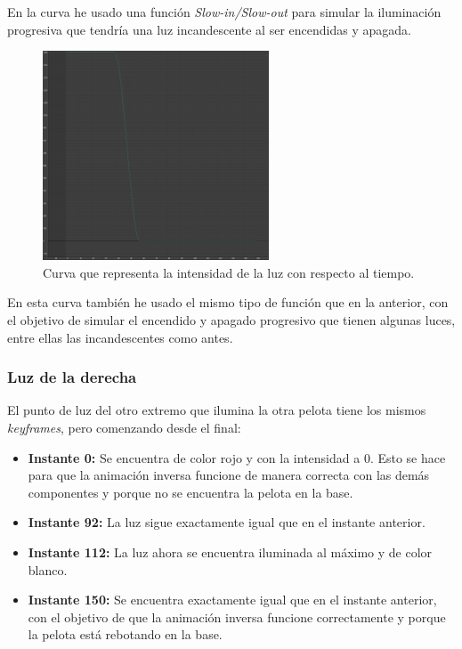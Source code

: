 \documentclass{article}
\begin{document}
En la curva he usado una función \textit{Slow-in/Slow-out} para simular la iluminación progresiva que tendría una luz incandescente al ser encendidas y apagada.

 \begin{figure}[H]
    \centering
    \includegraphics[width=0.6\textwidth]{imagenes/curvas/LL/intensity.png}
    \caption{Curva que representa la intensidad de la luz con respecto al tiempo.}
 \end{figure}

 En esta curva también he usado el mismo tipo de función que en la anterior, con el objetivo de simular el encendido y apagado progresivo que tienen algunas luces, entre ellas las incandescentes como antes.

 \subsubsection{Luz de la derecha}

 El punto de luz del otro extremo que ilumina la otra pelota tiene los mismos \textit{keyframes}, pero comenzando desde el final:

 \begin{itemize}
    \item \textbf{Instante 0: }Se encuentra de color rojo y con la intensidad a 0. Esto se hace para que la animación inversa funcione de manera correcta con las demás componentes y porque no se encuentra la pelota en la base.
    \item \textbf{Instante 92: }La luz sigue exactamente igual que en el instante anterior.
    \item \textbf{Instante 112: }La luz ahora se encuentra iluminada al máximo y de color blanco.
    \item \textbf{Instante 150: }Se encuentra exactamente igual que en el instante anterior, con el objetivo de que la animación inversa funcione correctamente y porque la pelota está rebotando en la base.
 \end{itemize}
 
\end{document}
